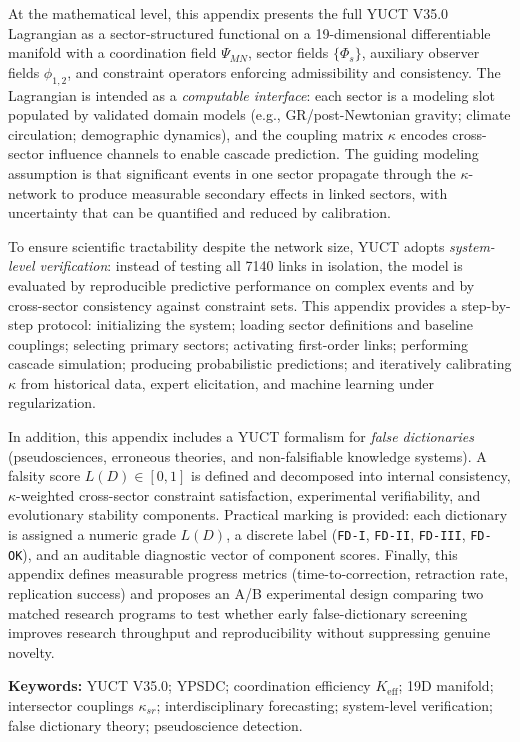 \documentclass[13pt,a4paper]{article}
\newcommand{\Keff}{K_{\mathrm{eff}}}
\begin{document}
\begin{titlepage}
\begin{center}
\begin{minipage}{0.92\textwidth}
				At the mathematical level, this appendix presents the full YUCT V35.0 Lagrangian as a sector-structured functional on a 19-dimensional differentiable manifold with a coordination field $\Psi_{MN}$, sector fields $\{\Phi_s\}$, auxiliary observer fields $\phi_{1,2}$, and constraint operators enforcing admissibility and consistency. The Lagrangian is intended as a \emph{computable interface}: each sector is a modeling slot populated by validated domain models (e.g., GR/post-Newtonian gravity; climate circulation; demographic dynamics), and the coupling matrix $\kappa$ encodes cross-sector influence channels to enable cascade prediction. The guiding modeling assumption is that significant events in one sector propagate through the $\kappa$-network to produce measurable secondary effects in linked sectors, with uncertainty that can be quantified and reduced by calibration.
				
				To ensure scientific tractability despite the network size, YUCT adopts \emph{system-level verification}: instead of testing all 7140 links in isolation, the model is evaluated by reproducible predictive performance on complex events and by cross-sector consistency against constraint sets. This appendix provides a step-by-step protocol: initializing the system; loading sector definitions and baseline couplings; selecting primary sectors; activating first-order links; performing cascade simulation; producing probabilistic predictions; and iteratively calibrating $\kappa$ from historical data, expert elicitation, and machine learning under regularization.
				
				In addition, this appendix includes a YUCT formalism for \emph{false dictionaries} (pseudosciences, erroneous theories, and non-falsifiable knowledge systems). A falsity score $L(D)\in[0,1]$ is defined and decomposed into internal consistency, $\kappa$-weighted cross-sector constraint satisfaction, experimental verifiability, and evolutionary stability components. Practical marking is provided: each dictionary is assigned a numeric grade $L(D)$, a discrete label (\texttt{FD-I}, \texttt{FD-II}, \texttt{FD-III}, \texttt{FD-OK}), and an auditable diagnostic vector of component scores. Finally, this appendix defines measurable progress metrics (time-to-correction, retraction rate, replication success) and proposes an A/B experimental design comparing two matched research programs to test whether early false-dictionary screening improves research throughput and reproducibility without suppressing genuine novelty.
			\end{minipage}
			
			\vfill
			\small
			\textbf{Keywords:} YUCT V35.0; YPSDC; coordination efficiency $\Keff$; 19D manifold; intersector couplings $\kappa_{sr}$; interdisciplinary forecasting; system-level verification; false dictionary theory; pseudoscience detection.
		\end{center}
	\end{titlepage}
	
\end{document}
